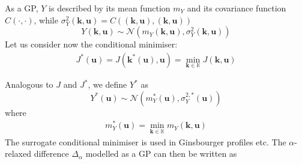 \documentclass[a4paper,11pt]{article}
\newcommand{\Kspace}{\mathbb{K}}
\begin{document}
As a GP, $Y$ is described by its mean function $m_{Y}$ and its covariance function $C(\cdot, \cdot)$, while $\sigma^2_Y(\mathbf{k},\mathbf{u}) = C((\mathbf{k},\mathbf{u}), (\mathbf{k},\mathbf{u}))$
\begin{equation}
  Y(\mathbf{k},\mathbf{u}) \sim \mathcal{N}\left(m_{Y}(\mathbf{k},\mathbf{u}), \sigma^2_Y(\mathbf{k},\mathbf{u}) \right)
\end{equation}
Let us consider now the conditional minimiser:
\begin{align}
  J^*(\mathbf{u}) = J(\mathbf{k}^*(\mathbf{u}),\mathbf{u}) = \min_{\mathbf{k}\in\Kspace} J(\mathbf{k},\mathbf{u})
\end{align}

Analogous to $J$ and $J^*$, we define $Y^*$ as
\begin{equation}
  Y^*(\mathbf{u}) \sim \mathcal{N}\left(m^*_Y(\mathbf{u}), \sigma^{2,*}_Y(\mathbf{u})\right)
\end{equation}
where
\begin{align}
  m^*_Y(\mathbf{u}) = \min_{\mathbf{k}\in\Kspace} m_Y(\mathbf{k},\mathbf{u})
\end{align}
The surrogate conditional minimiser is used in Ginsbourger profiles etc.
The $\alpha$-relaxed difference  $\Delta_{\alpha}$ modelled as a GP can then be written as
\end{document}
